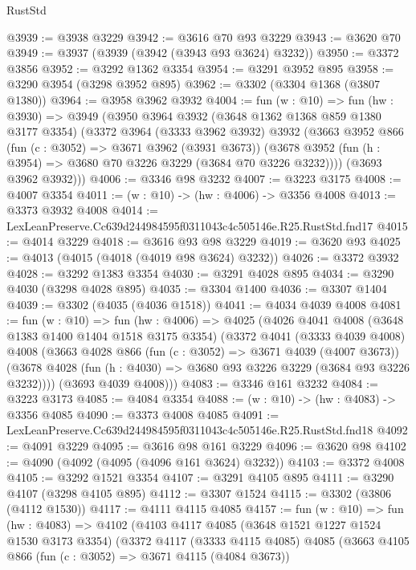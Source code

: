 \begin{lexlean}{RustStd}
\begin{coremodule}
@3939 := @3938 @3229
@3942 := @3616 @70 @93 @3229
@3943 := @3620 @70
@3949 := @3937 (@3939 (@3942 (@3943 @93 @3624) @3232))
@3950 := @3372 @3856
@3952 := @3292 @1362 @3354
@3954 := @3291 @3952 @895
@3958 := @3290 @3954 (@3298 @3952 @895)
@3962 := @3302 (@3304 @1368 (@3807 @1380))
@3964 := @3958 @3962 @3932
@4004 := fun (w : @10) =>
  fun (hw : @3930) =>
  @3949
    (@3950
      @3964
      @3932
      (@3648 @1362 @1368 @859 @1380 @3177 @3354)
      (@3372
        @3964
        (@3333 @3962 @3932)
        @3932
        (@3663
          @3952
          @866
          (fun (c : @3052) => @3671 @3962 (@3931 @3673))
          (@3678 @3952 (fun (h : @3954) => @3680 @70 @3226 @3229 (@3684 @70 @3226 @3232))))
        (@3693 @3962 @3932)))
@4006 := @3346 @98 @3232
@4007 := @3223 @3175
@4008 := @4007 @3354
@4011 := (w : @10) -> (hw : @4006) -> @3356 @4008
@4013 := @3373 @3932 @4008
@4014 := LexLeanPreserve.Cc639d244984595f0311043c4c505146e.R25.RustStd.fnd17
@4015 := @4014 @3229
@4018 := @3616 @93 @98 @3229
@4019 := @3620 @93
@4025 := @4013 (@4015 (@4018 (@4019 @98 @3624) @3232))
@4026 := @3372 @3932
@4028 := @3292 @1383 @3354
@4030 := @3291 @4028 @895
@4034 := @3290 @4030 (@3298 @4028 @895)
@4035 := @3304 @1400
@4036 := @3307 @1404
@4039 := @3302 (@4035 (@4036 @1518))
@4041 := @4034 @4039 @4008
@4081 := fun (w : @10) =>
  fun (hw : @4006) =>
  @4025
    (@4026
      @4041
      @4008
      (@3648 @1383 @1400 @1404 @1518 @3175 @3354)
      (@3372
        @4041
        (@3333 @4039 @4008)
        @4008
        (@3663
          @4028
          @866
          (fun (c : @3052) => @3671 @4039 (@4007 @3673))
          (@3678 @4028 (fun (h : @4030) => @3680 @93 @3226 @3229 (@3684 @93 @3226 @3232))))
        (@3693 @4039 @4008)))
@4083 := @3346 @161 @3232
@4084 := @3223 @3173
@4085 := @4084 @3354
@4088 := (w : @10) -> (hw : @4083) -> @3356 @4085
@4090 := @3373 @4008 @4085
@4091 := LexLeanPreserve.Cc639d244984595f0311043c4c505146e.R25.RustStd.fnd18
@4092 := @4091 @3229
@4095 := @3616 @98 @161 @3229
@4096 := @3620 @98
@4102 := @4090 (@4092 (@4095 (@4096 @161 @3624) @3232))
@4103 := @3372 @4008
@4105 := @3292 @1521 @3354
@4107 := @3291 @4105 @895
@4111 := @3290 @4107 (@3298 @4105 @895)
@4112 := @3307 @1524
@4115 := @3302 (@3806 (@4112 @1530))
@4117 := @4111 @4115 @4085
@4157 := fun (w : @10) =>
  fun (hw : @4083) =>
  @4102
    (@4103
      @4117
      @4085
      (@3648 @1521 @1227 @1524 @1530 @3173 @3354)
      (@3372
        @4117
        (@3333 @4115 @4085)
        @4085
        (@3663
          @4105
          @866
          (fun (c : @3052) => @3671 @4115 (@4084 @3673))

\end{coremodule}
\end{lexlean}
